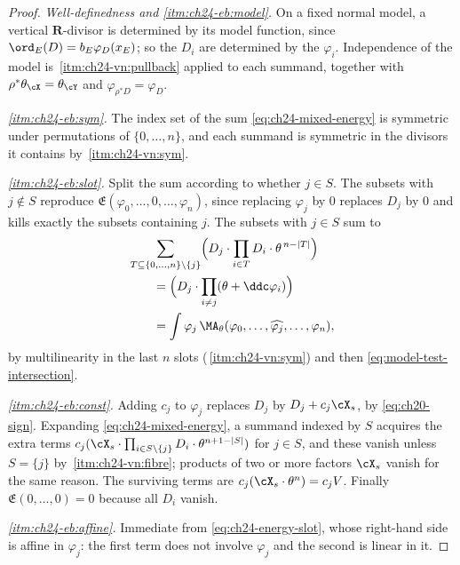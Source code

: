 \begin{proof}
\emph{Well-definedness and \cref{itm:ch24-eb:model}.}  On a fixed normal model,
a vertical \(\mathbf R\)-divisor is determined by its model function, since
\(\ord_E(D)=b_E\varphi_D(x_E)\); so the \(D_i\) are determined by the
\(\varphi_i\).  Independence of the model is
\,\cref{itm:ch24-vn:pullback} applied to each
summand, together with \(\rho^*\theta_{\cX}=\theta_{\cY}\) and
\(\varphi_{\rho^*D}=\varphi_D\).

\emph{\cref{itm:ch24-eb:sym}.}  The index set of the sum
\eqref{eq:ch24-mixed-energy} is symmetric under permutations of
\(\{0,\ldots,n\}\), and each summand is symmetric in the divisors it
contains by \,\cref{itm:ch24-vn:sym}.

\emph{\cref{itm:ch24-eb:slot}.}  Split the sum according to whether
\(j\in S\).  The subsets with \(j\notin S\) reproduce
\(\mathfrak E(\varphi_0,\ldots,0,\ldots,\varphi_n)\), since replacing
\(\varphi_j\) by \(0\) replaces \(D_j\) by \(0\) and kills exactly the
subsets containing \(j\).  The subsets with \(j\in S\) sum to
\[
 \begin{aligned}
 &\sum_{T\subseteq\{0,\ldots,n\}\setminus\{j\}}
  \Bigl(D_j\cdot\prod_{i\in T}D_i\cdot\theta^{\,n-|T|}\Bigr)\\
 &\qquad=\Bigl(D_j\cdot\prod_{i\neq j}(\theta+\ddc\varphi_i)\Bigr)\\
 &\qquad=\int\varphi_j\,\MA_\theta
   (\varphi_0,\ldots,\widehat{\varphi_j},\ldots,\varphi_n),
 \end{aligned}
\]
by multilinearity in the last \(n\) slots
(\,\cref{itm:ch24-vn:sym}) and then
\eqref{eq:model-test-intersection}.

\emph{\cref{itm:ch24-eb:const}.}  Adding \(c_j\) to \(\varphi_j\) replaces
\(D_j\) by \(D_j+c_j\cX_s\), by \eqref{eq:ch20-sign}.  Expanding
\eqref{eq:ch24-mixed-energy}, a summand indexed by \(S\) acquires the extra
terms
\(c_j(\cX_s\cdot\prod_{i\in S\setminus\{j\}}D_i\cdot\theta^{n+1-|S|})\) for
\(j\in S\), and these vanish unless \(S=\{j\}\) by
\,\cref{itm:ch24-vn:fibre}; products of two
or more factors \(\cX_s\) vanish for the same reason.  The surviving terms
are \(c_j(\cX_s\cdot\theta^n)=c_jV\).  Finally
\(\mathfrak E(0,\ldots,0)=0\) because all \(D_i\) vanish.

\emph{\cref{itm:ch24-eb:affine}.}  Immediate from
\eqref{eq:ch24-energy-slot}, whose right-hand side is affine in
\(\varphi_j\): the first term does not involve \(\varphi_j\) and the second
is linear in it.


\end{proof}
